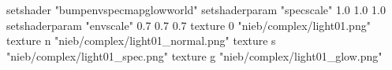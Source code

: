 setshader "bumpenvspecmapglowworld"
setshaderparam "specscale" 1.0 1.0 1.0
setshaderparam "envscale"  0.7 0.7 0.7
    texture 0 "nieb/complex/light01.png"
    texture n "nieb/complex/light01_normal.png"
    texture s "nieb/complex/light01_spec.png"
    texture g "nieb/complex/light01_glow.png"